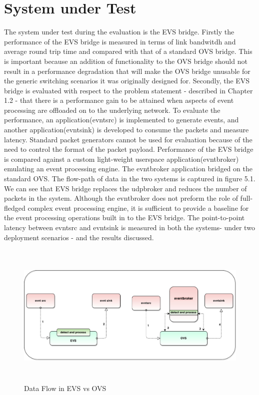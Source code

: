 \section{System under Test}
The system under test during the evaluation is the EVS bridge. Firstly the performance of the EVS bridge is measured in terms of link bandwitdh and average round trip time and compared with that of a standard OVS bridge. This is important because an addition of functionality to the OVS bridge should not result in a performance degradation that will make the OVS bridge unusable for the generic switching scenarios it was originally designed for. 
\newline
Secondly, the EVS bridge is evaluated with respect to the problem statement - described in Chapter 1.2 - that there is a performance gain to be attained when aspects of event processing are offloaded on to the underlying network. To evaluate the performance, an  application(evntsrc) is implemented to generate events, and another application(evntsink) is developed to consume the packets and measure latency. Standard packet generators cannot be used for evaluation because of the need to control the format of the packet payload. Performance of the EVS bridge is compared against a custom light-weight userspace application(evntbroker) emulating an event processing engine. The evntbroker application bridged on the standard OVS. The flow-path of data in the two systems is captured in figure 5.1. We can see that EVS bridge replaces the udpbroker and reduces the number of packets in the system. Although the evntbroker does not preform the role of full-fledged complex event processing engine, it is sufficient to provide a baseline for the event processing operations built in to the EVS bridge. The point-to-point latency between evntsrc and evntsink is measured in both the systems- under two deployment scenarios - and the results discussed.

 \begin{figure}[H]    
 \caption{Data Flow in EVS vs OVS}
  \includegraphics[height=7cm]{evsovs.pdf}
\end{figure}



